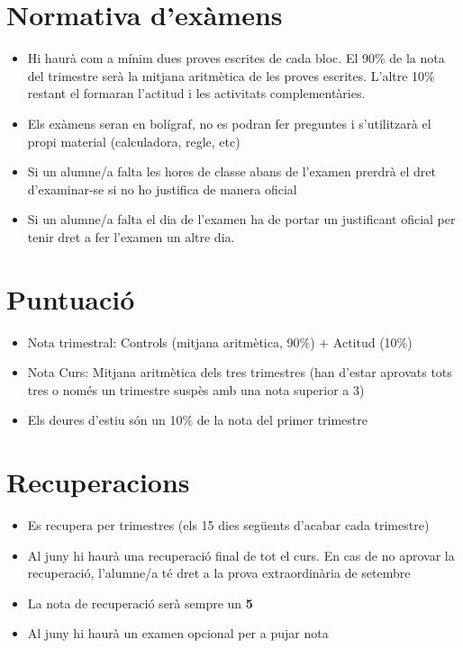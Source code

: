 \documentclass{article}
\begin{document}
\section{Normativa d'exàmens}

\begin{itemize}
\item Hi haurà com a mínim dues proves escrites de cada bloc. El 90\% de la nota del trimestre serà la mitjana aritmètica de les proves escrites. L'altre 10\% restant el formaran l'actitud i les activitats complementàries.
\item Els exàmens seran en bolígraf, no es podran fer preguntes i s'utilitzarà el propi material (calculadora, regle, etc)
\item Si un alumne/a falta les hores de classe abans de l'examen prerdrà el dret d'examinar-se si no ho justifica de manera oficial
\item Si un alumne/a falta el dia de l'examen ha de portar un justificant oficial per tenir dret a fer l'examen un altre dia.
\end{itemize}

\section{Puntuació}

\begin{itemize}
	\item Nota trimestral: Controls (mitjana aritmètica, 90\%) + Actitud (10\%)
	\item Nota Curs: Mitjana aritmètica dels tres trimestres (han d'estar aprovats tots tres o només un trimestre suspès amb una nota superior a 3)
	\item Els deures d'estiu són un 10\% de la nota del primer trimestre
\end{itemize}

\section{Recuperacions}

\begin{itemize}
	\item Es recupera per trimestres (els 15 dies següents d'acabar cada trimestre)
	\item Al juny hi haurà una recuperació final de tot el curs. En cas de no aprovar la recuperació, l'alumne/a té dret a la prova extraordinària de setembre
	\item La nota de recuperació serà sempre un \bfseries{5}
	\normalfont
	\item Al juny hi haurà un examen opcional per a pujar nota
\end{itemize}
\end{document}
